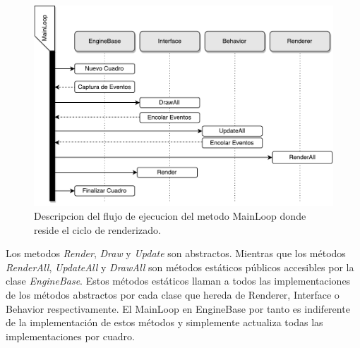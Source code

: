 \begin{figure}[H]
	\centering
	\captionsetup{justification=centering}
	\includegraphics[width=\linewidth]{media/mainloopflow.pdf}
	\caption{Descripcion del flujo de ejecucion del metodo MainLoop donde reside el ciclo de renderizado.}
\end{figure}

Los metodos \emph{Render}, \emph{Draw} y \emph{Update} son abstractos. Mientras que los métodos \emph{RenderAll}, \emph{UpdateAll} y \emph{DrawAll} son métodos estáticos públicos accesibles por la clase \emph{EngineBase}. Estos métodos estáticos llaman a todos las implementaciones de los métodos abstractos por cada clase que hereda de Renderer, Interface o Behavior respectivamente. El MainLoop en EngineBase por tanto es indiferente de la implementación de estos métodos y simplemente actualiza todas las implementaciones por cuadro.
